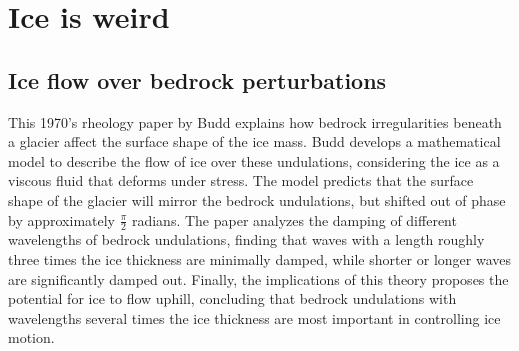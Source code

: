 \chapter{Ice is weird}

\section{Ice flow over bedrock perturbations}
This 1970's rheology paper by Budd explains how bedrock irregularities beneath a glacier affect the surface shape of the ice mass. Budd develops a mathematical model to describe the flow of ice over these undulations, considering the ice as a viscous fluid that deforms under stress. The model predicts that the surface shape of the glacier will mirror the bedrock undulations, but shifted out of phase by approximately $\frac{\pi}{2}$ radians. The paper analyzes the damping of different wavelengths of bedrock undulations, finding that waves with a length roughly three times the ice thickness are minimally damped, while shorter or longer waves are significantly damped out. Finally, the implications of this theory proposes the potential for ice to flow uphill, concluding that bedrock undulations with wavelengths several times the ice thickness are most important in controlling ice motion.







